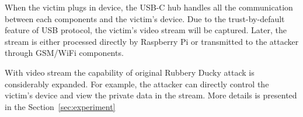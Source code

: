 When the victim plugs in \tool device, the USB-C hub handles all the communication between each components and the victim's device. Due to the trust-by-default feature of USB protocol, the victim's video stream will be captured. Later, the stream is either processed directly by Raspberry Pi or transmitted to the attacker through GSM/WiFi components.

With video stream the capability of original Rubbery Ducky attack is considerably expanded. For example, the attacker can directly control the victim's device and view the private data in the stream. More details is presented in the Section~\ref{sec:experiment}